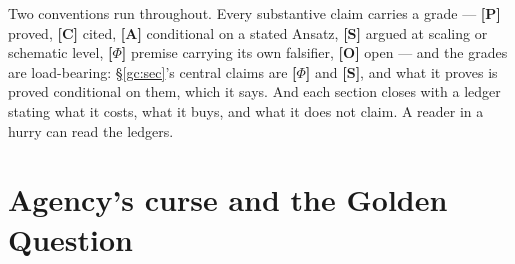 \documentclass[11pt]{article}
\numberwithin{equation}{section}
\theoremstyle{plain}
\theoremstyle{definition}
\theoremstyle{remark}
\begin{document}
Two conventions run throughout. Every substantive claim carries a grade
--- \textbf{[P]} proved, \textbf{[C]} cited, \textbf{[A]} conditional on a
stated Ansatz, \textbf{[S]} argued at scaling or schematic level,
\textbf{[$\Phi$]} premise carrying its own falsifier, \textbf{[O]} open --- and the grades are load-bearing:
\S\ref{gc:sec}'s central claims are \textbf{[$\Phi$]} and \textbf{[S]},
and what it proves is proved conditional on them, which it says. And each
section closes with a ledger stating what it costs, what it buys, and
what it does not claim. A reader in a hurry can read the ledgers.


%

\section{Agency's curse and the Golden Question}\label{ac:sec}
\end{document}
